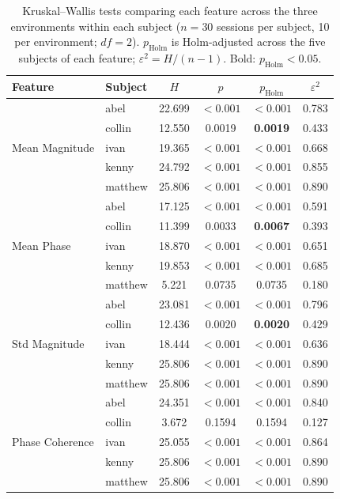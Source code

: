 \begin{table}[htbp]
  \centering
  \caption{Kruskal--Wallis tests comparing each feature across the three
  environments within each subject ($n = 30$ sessions per subject, 10 per
  environment; $df = 2$). $p_{\mathrm{Holm}}$ is Holm-adjusted across the five
  subjects of each feature; $\varepsilon^2 = H/(n-1)$. Bold: $p_{\mathrm{Holm}} < 0.05$.}
  \label{tab:kruskal_wallis_per_subject}
  \begin{tabular}{llcccc}
    \toprule
    Feature & Subject & $H$ & $p$ & $p_{\mathrm{Holm}}$ & $\varepsilon^2$ \\
    \midrule
    \multirow{5}{*}{Mean Magnitude}
      & abel    & 22.699 & $<0.001$ & $\mathbf{<0.001}$ & 0.783 \\
      & collin  & 12.550 & 0.0019   & \textbf{0.0019}   & 0.433 \\
      & ivan    & 19.365 & $<0.001$ & $\mathbf{<0.001}$ & 0.668 \\
      & kenny   & 24.792 & $<0.001$ & $\mathbf{<0.001}$ & 0.855 \\
      & matthew & 25.806 & $<0.001$ & $\mathbf{<0.001}$ & 0.890 \\
    \midrule
    \multirow{5}{*}{Mean Phase}
      & abel    & 17.125 & $<0.001$ & $\mathbf{<0.001}$ & 0.591 \\
      & collin  & 11.399 & 0.0033   & \textbf{0.0067}   & 0.393 \\
      & ivan    & 18.870 & $<0.001$ & $\mathbf{<0.001}$ & 0.651 \\
      & kenny   & 19.853 & $<0.001$ & $\mathbf{<0.001}$ & 0.685 \\
      & matthew &  5.221 & 0.0735   & 0.0735            & 0.180 \\
    \midrule
    \multirow{5}{*}{Std Magnitude}
      & abel    & 23.081 & $<0.001$ & $\mathbf{<0.001}$ & 0.796 \\
      & collin  & 12.436 & 0.0020   & \textbf{0.0020}   & 0.429 \\
      & ivan    & 18.444 & $<0.001$ & $\mathbf{<0.001}$ & 0.636 \\
      & kenny   & 25.806 & $<0.001$ & $\mathbf{<0.001}$ & 0.890 \\
      & matthew & 25.806 & $<0.001$ & $\mathbf{<0.001}$ & 0.890 \\
    \midrule
    \multirow{5}{*}{Phase Coherence}
      & abel    & 24.351 & $<0.001$ & $\mathbf{<0.001}$ & 0.840 \\
      & collin  &  3.672 & 0.1594   & 0.1594            & 0.127 \\
      & ivan    & 25.055 & $<0.001$ & $\mathbf{<0.001}$ & 0.864 \\
      & kenny   & 25.806 & $<0.001$ & $\mathbf{<0.001}$ & 0.890 \\
      & matthew & 25.806 & $<0.001$ & $\mathbf{<0.001}$ & 0.890 \\
    \bottomrule
  \end{tabular}
\end{table}
